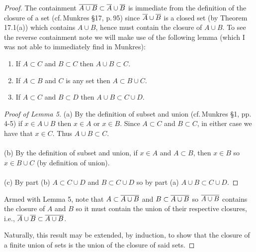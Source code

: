 \begin{proof}
The containment $\overline{A\cup B}\subset\overline{A}\cup\overline{B}$ is
immediate from the definition of the closure of a set
(cf.\,Munkres \S17, p.\,95) since $\overline{A}\cup\overline{B}$ is a closed
set (by Theorem 17.1(a)) which contains $A\cup B$, hence must
contain the closure of $A\cup B$. To see the reverse containment
note we will make use of the following lemma (which I was not
able to immediately find in Munkres):
\begin{lemma}
\begin{enumerate}[noitemsep,label=(\alph*)]
\item If $A\subset C$ and $B\subset C$ then $A\cup B\subset C$.
\item If $A\subset B$ and $C$ is any set then $A\subset B\cup C$.
\item If $A\subset C$ and $B\subset D$ then $A\cup B\subset C\cup
  D$.
\end{enumerate}
\end{lemma}
\begin{proof}[Proof of Lemma 5]
\renewcommand\qedsymbol{$\clubsuit$}
(a) By the definition of subset and union (cf.\,Munkres \S1,
pp.\,4-5) if $x\in A\cup B$ then $x\in A$ or $x\in B$. Since
$A\subset C$ and $B\subset C$, in either case we have that $x\in
C$. Thus $A\cup B\subset C$.
\\\\
(b) By the definition of subset and union, if $x\in A$ and
$A\subset B$, then $x\in B$ so $x\in B\cup C$ (by definition of
union).
\\\\
(c) By part (b) $A\subset C\cup D$ and $B\subset C\cup D$ so by
part (a) $A\cup B\subset C\cup D$.
\end{proof}
\noindent Armed with Lemma 5, note that $A\subset\overline{A\cup B}$
and $B\subset\overline{A\cup B}$ so $\overline{A\cup B}$ contains the
closure of $A$ and $B$ so it must contain the union of their
respective closures, i.e., $\overline{A}\cup\overline{B}\subset\overline{A\cup
  B}$.

Naturally, this result may be extended, by induction, to show
that the closure of a finite union of sets is the union of the
closure of said sets.
\end{proof}

